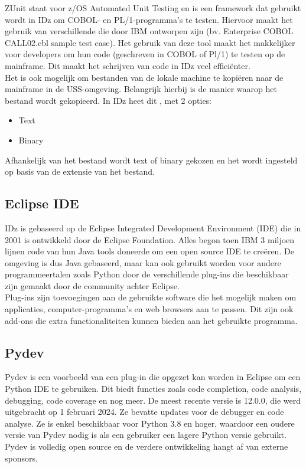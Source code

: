 ZUnit staat voor z/OS Automated Unit Testing en is een framework dat gebruikt wordt in IDz om COBOL- en PL/1-programma's te testen. Hiervoor maakt het gebruik van verschillende  die door IBM ontworpen zijn (bv. Enterprise COBOL CALL02.cbl sample test case). Het gebruik van deze tool maakt het makkelijker voor developers om hun code (geschreven in COBOL of Pl/1) te testen op de mainframe. Dit maakt het schrijven van code in IDz veel efficiënter. \autocite{IBM2024a} \\

Het is ook mogelijk om bestanden van de lokale machine te kopiëren naar de mainframe in de USS-omgeving. Belangrijk hierbij is de manier waarop het bestand wordt gekopieerd. In IDz heet dit , met 2 opties: 
\begin{itemize}
    \item Text
    \item Binary
\end{itemize}
Afhankelijk van het bestand wordt text of binary gekozen en het wordt ingesteld op basis van de extensie van het bestand.

\subsection{Eclipse IDE}
IDz is gebaseerd op de Eclipse Integrated Development Environment (IDE) die in 2001 is ontwikkeld door de Eclipse Foundation. Alles begon toen IBM 3 miljoen lijnen code van hun Java tools doneerde om een open source IDE te creëren. De omgeving is dus Java gebaseerd, maar kan ook gebruikt worden voor andere programmeertalen zoals Python door de verschillende plug-ins die beschikbaar zijn gemaakt door de community achter Eclipse. \autocite{Hanna2021} \\

Plug-ins zijn toevoegingen aan de gebruikte software die het mogelijk maken om applicaties, computer-programma's en web browsers aan te passen. Dit zijn ook add-ons die extra functionaliteiten kunnen bieden aan het gebruikte programma. \autocite{George2021} 

\subsection{Pydev}
Pydev is een voorbeeld van een plug-in die opgezet kan worden in Eclipse om een Python IDE te gebruiken.  Dit biedt functies zoals code completion, code analysis, debugging, code coverage en nog meer. De meest recente versie is 12.0.0, die werd uitgebracht op 1 februari 2024. Ze bevatte updates voor de debugger en code analyse. Ze is enkel beschikbaar voor Python 3.8 en hoger, waardoor een oudere versie van Pydev nodig is als een gebruiker een lagere Python versie gebruikt. Pydev is volledig open source en de verdere ontwikkeling hangt af van externe sponsors. \autocite{Pydev2024}

